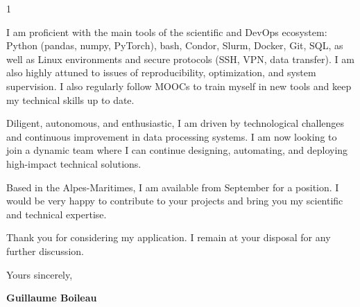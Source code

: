 \documentclass[10pt,a4paper]{altacv}
\begin{document}
\begin{paracol}{1}
{I am proficient with the main tools of the scientific and DevOps ecosystem: Python (pandas, numpy, PyTorch), bash, Condor, Slurm, Docker, Git, SQL, as well as Linux environments and secure protocols (SSH, VPN, data transfer). I am also highly attuned to issues of reproducibility, optimization, and system supervision. I also regularly follow MOOCs to train myself in new tools and keep my technical skills up to date.

Diligent, autonomous, and enthusiastic, I am driven by technological challenges and continuous improvement in data processing systems. I am now looking to join a dynamic team where I can continue designing, automating, and deploying high-impact technical solutions.

Based in the Alpes-Maritimes, I am available from September for a position. I would be very happy to contribute to your projects and bring you my scientific and technical expertise.

Thank you for considering my application. I remain at your disposal for any further discussion.

Yours sincerely,

\textbf{Guillaume Boileau}


}


\end{paracol}
\end{document}

